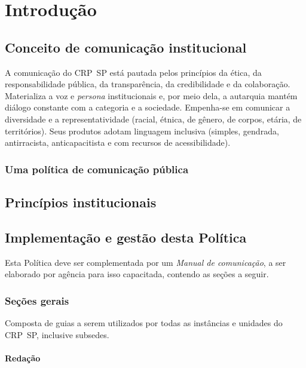 \chapter{Introdução}

\section{Conceito de comunicação institucional}

A comunicação do CRP~SP está pautada pelos princípios da ética, da responsabilidade pública, da transparência, da credibilidade e da colaboração. Materializa a voz e \emph{persona} institucionais e, por meio dela, a autarquia mantém diálogo constante com a categoria e a sociedade. Empenha-se em comunicar a diversidade e a representatividade (racial, étnica, de gênero, de corpos, etária, de territórios). Seus produtos adotam linguagem inclusiva (simples, gendrada, antirracista, anticapacitista e com recursos de acessibilidade).

\subsection{Uma política de comunicação pública}




\section{Princípios institucionais}

\section{Implementação e gestão desta Política}

Esta Política deve ser complementada por um \emph{Manual de comunicação}, a ser elaborado por agência para isso capacitada, contendo as seções a seguir.

\subsection{Seções gerais}

Composta de guias a serem utilizados por todas as instâncias e unidades do CRP~SP, inclusive subsedes.

\subsubsection{Redação}

